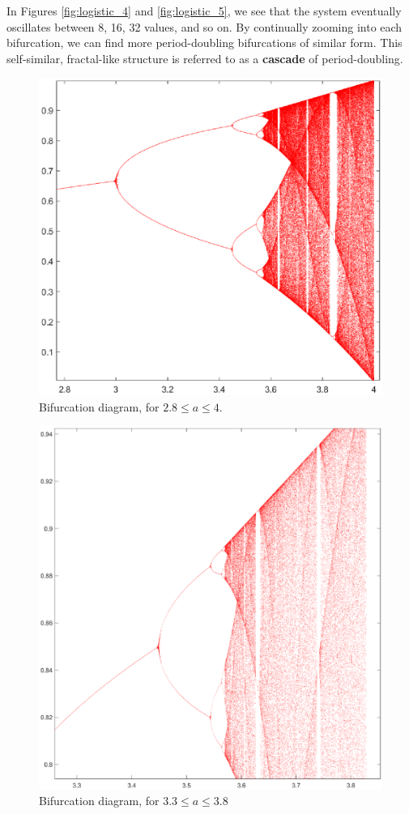 \documentclass[twocolumn,amsmath,amssymb,aps]{revtex4}
\begin{document}
In Figures \ref{fig:logistic_4} and \ref{fig:logistic_5}, we see that the system eventually oscillates between 8, 16, 32 values, and so on. By continually zooming into each bifurcation, we can find more period-doubling bifurcations of similar form. This self-similar, fractal-like structure is referred to as a \textbf{cascade} of period-doubling. 
\begin{figure}[!htb]
	\centering
	\includegraphics[scale=0.5]{logistic_1}
	\caption{Bifurcation diagram, for $2.8 \leq a \leq 4$.}
	\label{fig:logistic_1}
\end{figure}
\begin{figure}[!htb]
	\centering
	\includegraphics[scale=0.35]{logistic_3}
	\caption{Bifurcation diagram, for $3.3 \leq a \leq 3.8$}
	\label{fig:logistic_3}
\end{figure}
\end{document}
